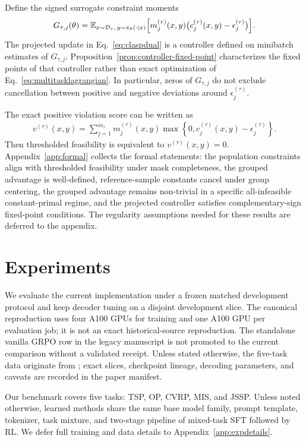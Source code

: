 \documentclass{article}
\theoremstyle{remark}
\begin{document}
Define the signed surrogate constraint moments
\begin{align}
G_{\tau,j}(\theta)
=
\mathbb{E}_{x\sim\mathcal D_\tau,\,y\sim\pi_\theta(\cdot\mid x)}
\Bigl[m_j^{(\tau)}(x,y)\bigl(c_j^{(\tau)}(x,y)-\epsilon_j^{(\tau)}\bigr)\Bigr].
\label{eq:signedconstraint}
\end{align}
The projected update in Eq.~\eqref{eq:claspdual} is a controller defined on minibatch estimates of \(G_{\tau,j}\). Proposition~\ref{prop:controller-fixed-point} characterizes the fixed points of that controller rather than exact optimization of Eq.~\eqref{eq:multitasklagrangian}. In particular, zeros of \(G_{\tau,j}\) do not exclude cancellation between positive and negative deviations around \(\epsilon_j^{(\tau)}\).

The exact positive violation score can be written as
\begin{align}
v^{(\tau)}(x,y)
=
\sum_{j=1}^{m_\tau} m_j^{(\tau)}(x,y)
\max\!\left\{0,c_j^{(\tau)}(x,y)-\epsilon_j^{(\tau)}\right\}.
\end{align}
Then thresholded feasibility is equivalent to \(v^{(\tau)}(x,y)=0\). Appendix~\ref{app:formal} collects the formal statements: the population constraints align with thresholded feasibility under mask completeness, the grouped advantage is well-defined, reference-sample constants cancel under group centering, the grouped advantage remains non-trivial in a specific all-infeasible constant-primal regime, and the projected controller satisfies complementary-sign fixed-point conditions. The regularity assumptions needed for these results are deferred to the appendix.
\section{Experiments}
\label{sec:experiments}
We evaluate the current implementation under a frozen matched development protocol and keep decoder tuning on a disjoint development slice. The canonical reproduction uses four A100 GPUs for training and one A100 GPU per evaluation job; it is not an exact historical-source reproduction. The standalone vanilla GRPO row in the legacy manuscript is not promoted to the current comparison without a validated receipt. Unless stated otherwise, the five-task data originate from \citet{jiang2025endtoendco}; exact slices, checkpoint lineage, decoding parameters, and caveats are recorded in the paper manifest.

Our benchmark covers five tasks: TSP, OP, CVRP, MIS, and JSSP. Unless noted otherwise, learned methods share the same base model family, prompt template, tokenizer, task mixture, and two-stage pipeline of mixed-task SFT followed by RL. We defer full training and data details to Appendix~\ref{app:expdetails}.
\end{document}
